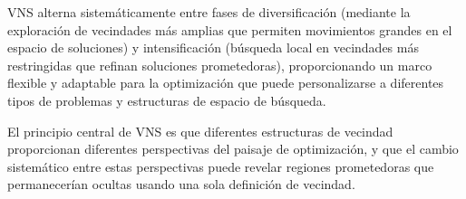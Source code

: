 VNS alterna sistemáticamente entre fases de diversificación (mediante la exploración de vecindades más amplias que permiten movimientos grandes en el espacio de soluciones) y intensificación (búsqueda local en vecindades más restringidas que refinan soluciones prometedoras), proporcionando un marco flexible y adaptable para la optimización que puede personalizarse a diferentes tipos de problemas y estructuras de espacio de búsqueda.

El principio central de VNS es que diferentes estructuras de vecindad proporcionan diferentes perspectivas del paisaje de optimización, y que el cambio sistemático entre estas perspectivas puede revelar regiones prometedoras que permanecerían ocultas usando una sola definición de vecindad.

\begin{table}[htbp]
\centering
{}
\end{table}
